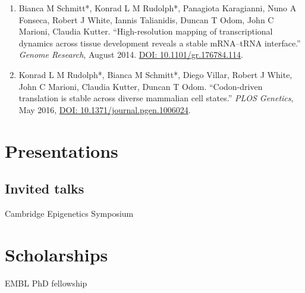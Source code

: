 \documentclass{klmr-cv}
\begin{document}

\begin{enumerate}
    \item Bianca M Schmitt*, Konrad L M Rudolph*, Panagiota Karagianni,
        Nuno A Fonseca, Robert J White, Iannis Talianidis, Duncan T Odom,
        John C Marioni, Claudia Kutter. “High-resolution mapping of
        transcriptional dynamics across tissue development reveals a stable
        mRNA--tRNA interface.” \textit{Genome Research}, August 2014.
        \href{http://dx.doi.org/10.1101/gr.176784.114}{DOI:
        10.1101/gr.176784.114}.

    \item Konrad L M Rudolph*, Bianca M Schmitt*, Diego Villar, Robert J
        White, John C Marioni, Claudia Kutter, Duncan T Odom. “Codon-driven
        translation is stable across diverse mammalian cell states.”
        \textit{PLOS Genetics}, May 2016,
        \href{http://dx.doi.org/10.1371/journal.pgen.1006024}{DOI:
        10.1371/journal.pgen.1006024}.
\end{enumerate}

\section{Presentations}

\subsection{Invited talks}

\date{2014}
Cambridge Epigenetics Symposium

\section{Scholarships}

EMBL PhD fellowship
\end{document}
